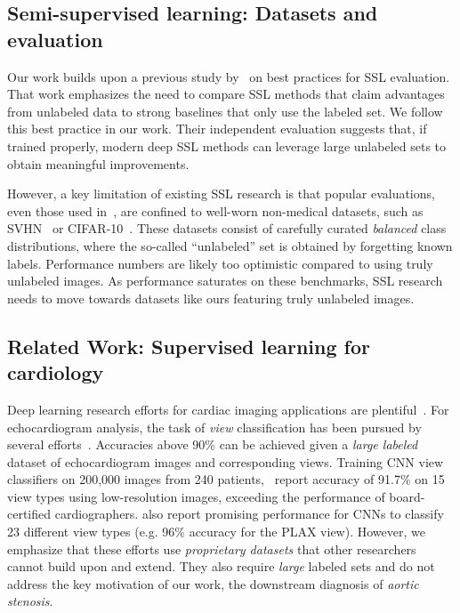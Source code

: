 \subsection{Semi-supervised learning: Datasets and evaluation}

Our work builds upon a previous study by~\citet{oliverRealisticEvaluationDeep2018} on best practices for SSL evaluation.
That work emphasizes the need to compare SSL methods that claim advantages from unlabeled data to strong baselines that only use the labeled set.
We follow this best practice in our work.
Their independent evaluation suggests that, if trained properly, modern deep SSL methods can leverage large unlabeled sets to obtain meaningful improvements.

However, a key limitation of existing SSL research is that popular evaluations, even those used in~\citet{oliverRealisticEvaluationDeep2018}, are confined to well-worn non-medical datasets, such as SVHN~\citep{netzerReadingDigitsNatural2011} or CIFAR-10~\citep{krizhevskyLearningMultipleLayers2009}.
These datasets consist of carefully curated \emph{balanced} class distributions, where the so-called ``unlabeled'' set is obtained by forgetting known labels.
Performance numbers are likely too optimistic compared to using truly unlabeled images.
As performance saturates on these benchmarks,
 SSL research needs to move towards datasets like ours featuring truly unlabeled images.
 
\subsection{Related Work: Supervised learning for cardiology}

Deep learning research efforts for cardiac imaging applications are plentiful~\citep{chenDeepLearningCardiac2020}.
For echocardiogram analysis, the task of \emph{view} classification has been pursued by several efforts~\citep{madaniFastAccurateView2018,zhangFullyAutomatedEchocardiogram2018,longIdentificationEchocardiographicImaging2018}.
Accuracies above 90\% can be achieved given a \emph{large labeled} dataset of echocardiogram images and corresponding views.
Training CNN view classifiers on 200,000 images from 240 patients,~\citet{madaniFastAccurateView2018} report accuracy of 91.7\% on 15 view types using low-resolution images, exceeding the performance of board-certified cardiographers.
\citet{zhangFullyAutomatedEchocardiogram2018} also report promising performance for CNNs to classify 23 different view types (e.g. 96\% accuracy for the PLAX view).
However, we emphasize that these efforts use \emph{proprietary datasets} that other researchers cannot build upon and extend. They also require \emph{large} labeled sets and do not address the key motivation of our work, the downstream diagnosis of \emph{aortic stenosis}.


